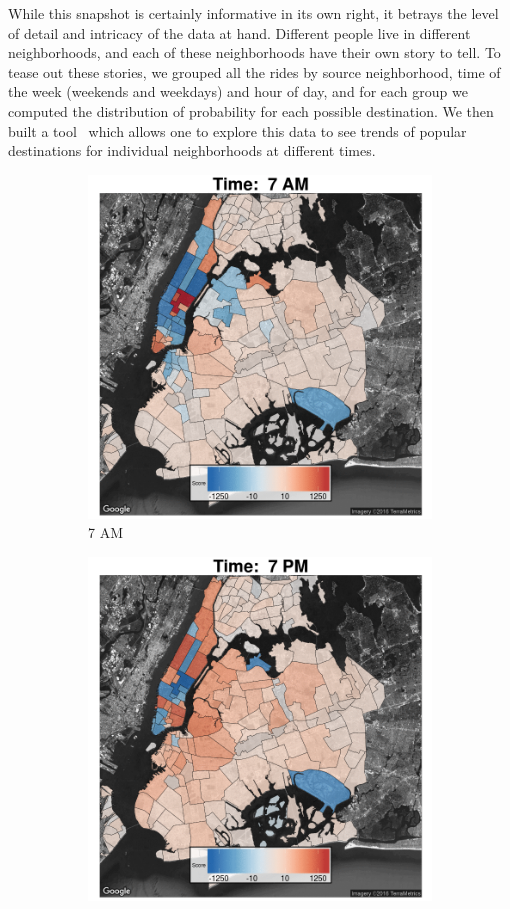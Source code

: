 \documentclass[twocolumn]{article}
\begin{document}
While this snapshot is certainly informative in its own right, it betrays the level of detail and intricacy of the data at hand. Different people live in different neighborhoods, and each of these neighborhoods have their own story to tell. To tease out these stories, we grouped all the rides by source neighborhood, time of the week (weekends and weekdays) and hour of day, and for each group we computed the distribution of probability for each possible destination. We then built a tool~\cite{DS3:2016} which allows one to explore this data to see trends of popular destinations for individual neighborhoods at different times. 


\begin{figure}[h]
 
\begin{subfigure}{0.5\textwidth}
\includegraphics[width=0.9\linewidth]{7am} 
\caption{7 AM}
\label{fig:7am}
\end{subfigure}
\begin{subfigure}{0.5\textwidth}
\includegraphics[width=0.9\linewidth]{7pm}

\end{subfigure}
\end{figure}
\end{document}
